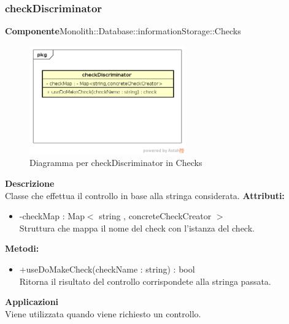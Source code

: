 \subsubsection{checkDiscriminator}
\textbf{Componente}Monolith::Database::informationStorage::Checks\\
   \FloatBarrier
   \begin{figure}[ht]
   \centering
   \includegraphics[width=0.6\textwidth]{img/single-checkDiscriminator}
   \caption{{Diagramma per checkDiscriminator in Checks}}
\end{figure}
\FloatBarrier
\textbf{Descrizione}\\
Classe che effettua il controllo in base alla stringa considerata.
\textbf{Attributi:} \begin{itemize}\item -checkMap : Map$<$ string , concreteCheckCreator $>$ \\Struttura che mappa il nome del check con l'istanza del check.\end{itemize}
\textbf{Metodi:} \begin{itemize}
\item +useDoMakeCheck(checkName : string) : bool \\Ritorna il risultato del controllo corrispondete alla stringa passata.
\end{itemize} 


\textbf{Applicazioni}\\
Viene utilizzata quando viene richiesto un controllo. 


\clearpage

